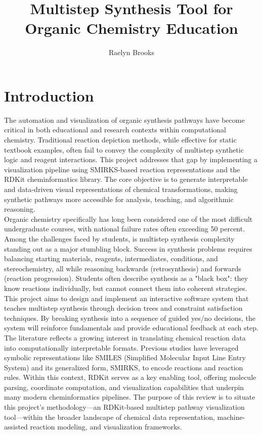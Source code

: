 \documentclass[12pt]{article}
\title{\textbf{Multistep Synthesis Tool for Organic Chemistry Education}}
\author{Raelyn Brooks}
\begin{document}
\maketitle

\section{Introduction}
\indent
The automation and visualization of organic synthesis pathways have become critical in both educational and research contexts within computational chemistry.
Traditional reaction depiction methods, while effective for static textbook examples, often fail to convey the complexity of multistep synthetic logic and reagent interactions.
This project addresses that gap by implementing a visualization pipeline using SMIRKS-based reaction representations and the RDKit cheminformatics library.
The core objective is to generate interpretable and data-driven visual representations of chemical transformations, making synthetic pathways more accessible for analysis, teaching, and algorithmic reasoning.
\\
\indent
Organic chemistry specifically has long been considered one of the most difficult undergraduate courses, with national failure rates often exceeding 50 percent. 
Among the challenges faced by students, is multistep synthesis complexity standing out as a major stumbling block. 
Success in synthesis problems requires balancing starting materials, reagents, intermediates, conditions, and stereochemistry, all while reasoning backwards (retrosynthesis) and forwards (reaction progression). 
Students often describe synthesis as a "black box": they know reactions individually, but cannot connect them into coherent strategies.
This project aims to design and implement an interactive software system that teaches multistep synthesis through decision trees and constraint satisfaction techniques. 
By breaking synthesis into a sequence of guided yes/no decisions, the system will reinforce fundamentals and provide educational feedback at each step. 
\\
\indent
The literature reflects a growing interest in translating chemical reaction data into computationally interpretable formats. 
Previous studies have leveraged symbolic representations like SMILES (Simplified Molecular Input Line Entry System) and its generalized form, SMIRKS, to encode reactions and reaction rules. 
Within this context, RDKit serves as a key enabling tool, offering molecule parsing, coordinate computation, and visualization capabilities that underpin many modern cheminformatics pipelines. 
The purpose of this review is to situate this project’s methodology—an RDKit-based multistep pathway visualization tool—within the broader landscape of chemical data representation, machine-assisted reaction modeling, and visualization frameworks.
\\
\end{document}
